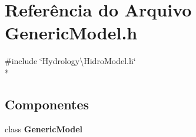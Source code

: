 \section{Referência do Arquivo Generic\+Model.\+h}
\label{_generic_model_8h}
{\ttfamily \#include \char`\"{}Hydrology\textbackslash{}\+Hidro\+Model.\+h\char`\"{}}\\*
\subsection*{Componentes}
\begin{DoxyCompactItemize}
\item 
class {\bf Generic\+Model}
\end{DoxyCompactItemize}
